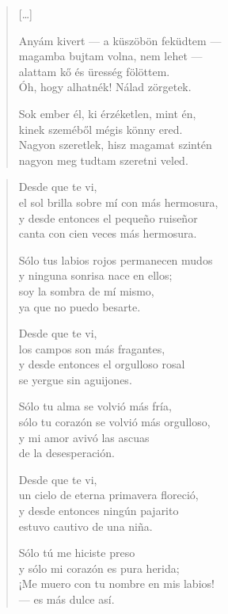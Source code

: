 \documentclass[11pt]{book}
\newcommand*{\centeredornament}{\centerline{\pgfornament[width=6cm]{88}}}
\begin{document}
\newpage

\vspace*{-15mm}
\centeredornament


\poemtitle*{\phantom{Gyermekké tettél}}

\begin{verse}
  \textnormal{[\ldots]}

  Anyám kivert --- a küszöbön feküdtem --- \\
  magamba bujtam volna, nem lehet --- \\
  alattam kő és üresség fölöttem. \\
  Óh, hogy alhatnék! Nálad zörgetek.

  Sok ember él, ki érzéketlen, mint én, \\
  kinek szeméből mégis könny ered. \\
  Nagyon szeretlek, hisz magamat szintén \\
  nagyon meg tudtam szeretni veled.
\end{verse}

\newpage

\vspace*{-15mm}
\centeredornament



\begin{verse}
  Desde que te vi, \\
  el sol brilla sobre mí con más hermosura, \\
  y desde entonces el pequeño ruiseñor \\
  canta con cien veces más hermosura.

  Sólo tus labios rojos permanecen mudos \\
  y ninguna sonrisa nace en ellos; \\
  soy la sombra de mí mismo, \\
  ya que no puedo besarte.

  Desde que te vi, \\
  los campos son más fragantes, \\
  y desde entonces el orgulloso rosal \\
  se yergue sin aguijones.

  Sólo tu alma se volvió más fría, \\
  sólo tu corazón se volvió más orgulloso, \\
  y mi amor avivó las ascuas \\
  de la desesperación.

  Desde que te vi, \\
  un cielo de eterna primavera floreció, \\
  y desde entonces ningún pajarito \\
  estuvo cautivo de una niña.

  Sólo tú me hiciste preso \\
  y sólo mi corazón es pura herida; \\
  ¡Me muero con tu nombre en mis labios! \\
  --- es más dulce así.
\end{verse}
\end{document}
